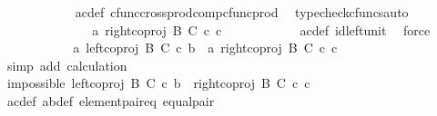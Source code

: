 \begin{isabellebody}
\ \ \ \ \ \ \ \ \ \ \isamarkupfalse%
\ a{\isacharprime}{\kern0pt}c{\isacharprime}{\kern0pt}{\isacharunderscore}{\kern0pt}def\ cfunc{\isacharunderscore}{\kern0pt}cross{\isacharunderscore}{\kern0pt}prod{\isacharunderscore}{\kern0pt}comp{\isacharunderscore}{\kern0pt}cfunc{\isacharunderscore}{\kern0pt}prod\ \isamarkupfalse%
\ {\isacharparenleft}{\kern0pt}typecheck{\isacharunderscore}{\kern0pt}cfuncs{\isacharcomma}{\kern0pt}auto{\isacharparenright}{\kern0pt}\isanewline
\ \ \ \ \ \ \ \ \isamarkupfalse%
\ \isamarkupfalse%
\ {\isachardoublequoteopen}{\isachardot}{\kern0pt}{\isachardot}{\kern0pt}{\isachardot}{\kern0pt}\ {\isacharequal}{\kern0pt}\ \ {\isasymlangle}a{\isacharprime}{\kern0pt}{\isacharcomma}{\kern0pt}\ right{\isacharunderscore}{\kern0pt}coproj\ B\ C\ {\isasymcirc}\isactrlsub c\ c{\isacharprime}{\kern0pt}{\isasymrangle}{\isachardoublequoteclose}\isanewline
\ \ \ \ \ \ \ \ \ \ \isamarkupfalse%
\ a{\isacharprime}{\kern0pt}c{\isacharprime}{\kern0pt}{\isacharunderscore}{\kern0pt}def\ id{\isacharunderscore}{\kern0pt}left{\isacharunderscore}{\kern0pt}unit{}\ \isamarkupfalse%
\ force\isanewline
\ \ \ \ \ \ \ \ \isamarkupfalse%
\ \isamarkupfalse%
\ {\isachardoublequoteopen}{\isasymlangle}a{\isacharcomma}{\kern0pt}\ left{\isacharunderscore}{\kern0pt}coproj\ B\ C\ {\isasymcirc}\isactrlsub c\ b{\isasymrangle}\ {\isacharequal}{\kern0pt}\ {\isasymlangle}a{\isacharprime}{\kern0pt}{\isacharcomma}{\kern0pt}\ right{\isacharunderscore}{\kern0pt}coproj\ B\ C\ {\isasymcirc}\isactrlsub c\ c{\isacharprime}{\kern0pt}{\isasymrangle}{\isachardoublequoteclose}\isanewline
\ \ \ \ \ \ \ \ \ \ \isamarkupfalse%
\ {\isacharparenleft}{\kern0pt}simp\ add{\isacharcolon}{\kern0pt}\ calculation{\isacharparenright}{\kern0pt}\isanewline
\ \ \ \ \ \ \isamarkupfalse%
\ \ \ \ \ \ \ \ \isanewline
\ \ \ \ \ \ \isamarkupfalse%
\ \isamarkupfalse%
\ impossible{\isacharcolon}{\kern0pt}\ {\isachardoublequoteopen}left{\isacharunderscore}{\kern0pt}coproj\ B\ C\ {\isasymcirc}\isactrlsub c\ b\ {\isacharequal}{\kern0pt}\ right{\isacharunderscore}{\kern0pt}coproj\ B\ C\ {\isasymcirc}\isactrlsub c\ c{\isacharprime}{\kern0pt}{\isachardoublequoteclose}\isanewline
\ \ \ \ \ \ \ \ \isamarkupfalse%
\ a{\isacharprime}{\kern0pt}c{\isacharprime}{\kern0pt}{\isacharunderscore}{\kern0pt}def\ ab{\isacharunderscore}{\kern0pt}def\ element{\isacharunderscore}{\kern0pt}pair{\isacharunderscore}{\kern0pt}eq\ equal{\isacharunderscore}{\kern0pt}pair\ \isamarkupfalse%

\end{isabellebody}
